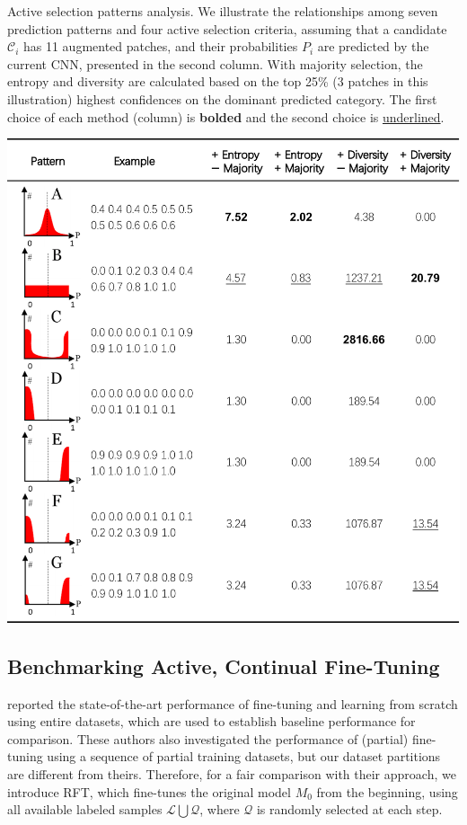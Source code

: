 \begin{table}[t]
\caption[Analysis on Active Selection Pattern]{
Active selection patterns analysis. We illustrate the relationships among seven prediction patterns and four active selection criteria, assuming that a candidate $\mathcal{C}_i$ has 11 augmented patches, and their probabilities $P_i$ are predicted by the current CNN, presented in the second column. With majority selection, the entropy and diversity are calculated based on the top 25\% (3 patches in this illustration) highest confidences on the dominant predicted category. The first choice of each method (column) is \textbf{bolded} and the second choice is \underline{underlined}.
}
\label{ch3:tab:predict_pattern}
\begin{center}
\includegraphics[width=0.7\linewidth]{Figures/CH3/fig_hypothsis_pattern.pdf}\\
\end{center}
\end{table}

\subsection{Benchmarking Active, Continual Fine-Tuning}
\label{sch2:experiment_result:benchmarking_active_continual_finetuning}


\citet{tajbakhsh2016convolutional} reported the state-of-the-art performance of fine-tuning and learning from scratch using entire datasets, which are used to establish baseline performance for comparison. These authors also investigated the performance of (partial) fine-tuning using a sequence of partial training datasets, but our dataset partitions are different from theirs. Therefore, for a fair comparison with their approach, we introduce RFT, which fine-tunes the original model $M_0$  from the beginning, using all available labeled samples $\mathcal{L}\bigcup\mathcal{Q}$, where $\mathcal{Q}$ is randomly selected at each step. 

